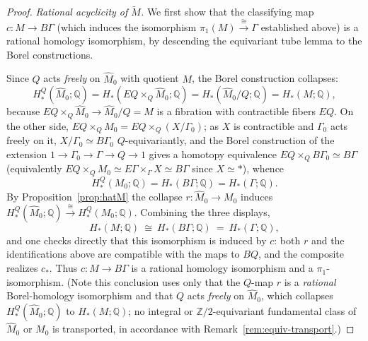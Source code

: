 \documentclass[12pt]{article}
\theoremstyle{definition}
\begin{document}
\begin{proof}
\emph{Rational acyclicity of $\widetilde M$.} We first show that the
classifying map $c\colon M\to B\Gamma$ (which induces the isomorphism
$\pi_1(M)\xrightarrow{\cong}\Gamma$ established above) is a rational homology
isomorphism, by descending the equivariant tube lemma to the Borel
constructions.

Since $Q$ acts \emph{freely} on $\widehat M_0$ with quotient $M$, the Borel
construction collapses:
\[
   H^Q_*(\widehat M_0;\mathbb{Q})
   = H_*(EQ\times_Q\widehat M_0;\mathbb{Q})
   = H_*(\widehat M_0/Q;\mathbb{Q}) = H_*(M;\mathbb{Q}),
\]
because $EQ\times_Q\widehat M_0\to\widehat M_0/Q=M$ is a fibration with
contractible fibers $EQ$. On the other side, $EQ\times_Q M_0=EQ\times_Q(X/\Gamma_0)$;
as $X$ is contractible and $\Gamma_0$ acts freely on it, $X/\Gamma_0\simeq B\Gamma_0$
$Q$-equivariantly, and the Borel construction of the extension
$1\to\Gamma_0\to\Gamma\to Q\to1$ gives a homotopy equivalence
$EQ\times_Q B\Gamma_0\simeq B\Gamma$ (equivalently
$EQ\times_Q M_0\simeq E\Gamma\times_\Gamma X\simeq B\Gamma$ since $X\simeq\ast$),
whence
\[
   H^Q_*(M_0;\mathbb{Q})=H_*(B\Gamma;\mathbb{Q})=H_*(\Gamma;\mathbb{Q}).
\]
By Proposition~\ref{prop:hatM} the collapse $r\colon\widehat M_0\to M_0$ induces
$H^Q_*(\widehat M_0;\mathbb{Q})\xrightarrow{\cong}H^Q_*(M_0;\mathbb{Q})$.
Combining the three displays,
\begin{equation}\label{eq:Mhomology}
   H_*(M;\mathbb{Q})\ \cong\ H_*(B\Gamma;\mathbb{Q})\ =\ H_*(\Gamma;\mathbb{Q}),
\end{equation}
and one checks directly that this isomorphism is induced by $c$: both $r$ and the
identifications above are compatible with the maps to $BQ$, and the composite
realizes $c_*$. Thus $c\colon M\to B\Gamma$ is a rational homology isomorphism
and a $\pi_1$-isomorphism. (Note this conclusion uses only that the $Q$-map $r$
is a \emph{rational} Borel-homology isomorphism and that $Q$ acts \emph{freely}
on $\widehat M_0$, which collapses $H^Q_*(\widehat M_0;\mathbb{Q})$ to
$H_*(M;\mathbb{Q})$; no integral or $\mathbb{Z}/2$-equivariant fundamental class
of $\widehat M_0$ or $M_0$ is transported, in accordance with
Remark~\ref{rem:equiv-transport}.)


\end{proof}
\end{document}
